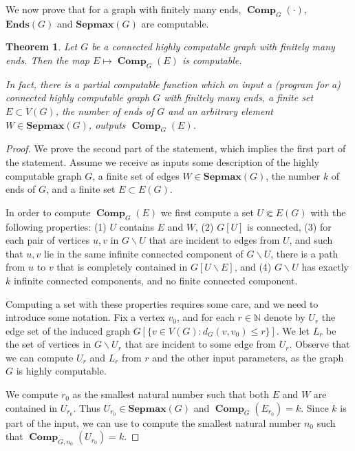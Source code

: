 \documentclass[10pt,A4]{amsart}
\newtheorem{thm}{Theorem}[section]
\theoremstyle{definition}
\theoremstyle{definition}
\newcommand{\N}{\mathbb{N}}
\newcommand{\Ends}[1]{\mathbf{Ends}({#1})}
\newcommand{\sepmax}[1]{\mathbf{Sepmax}({#1})}
\renewcommand{\mid}{ : }
\newcommand{\comp}{\operatorname{\mathbf{Comp}}}
\begin{document}
We now prove that for a graph with finitely many ends, $\comp_G(\cdot)$, $\Ends{G}$ and $\sepmax{G}$ are computable. 
\begin{thm}\label{thm:magic_function}
    Let $G$ be a connected highly computable graph with finitely many ends. Then the map $E\mapsto \comp_G(E)$ is computable. 

    In fact, there is a partial computable function which on input a (program for a) connected highly computable graph $G$ with finitely many ends, a finite set $E \subset V(G)$, the number of ends of $G$ and an arbitrary element $W \in \sepmax{G}$, outputs $\comp_{G}(E)$. 
\end{thm}
\begin{proof}
    We prove the second part of the statement, which implies the first part of the statement. Assume we receive as inputs some description of the highly computable graph $G$, a finite set of edges $W \in \sepmax{G}$, the number $k$ of ends of $G$, and a finite set $E \subset E(G)$. 
    
    In order to compute $\comp_G(E)$ we first compute  a set $U\Subset E(G)$ with the following properties: (1) $U$ contains $E$ and $W$, (2) $G[U]$ is connected, (3) for each pair of vertices  $u,v$ in $G\smallsetminus U$ that are incident to edges from $U$, and such that $u,v$ lie in the same infinite connected component of $G\smallsetminus U$, there is a path from $u$ to $v$ that is completely contained in $G[U\smallsetminus E]$, and (4) $G\smallsetminus U$ has exactly $k$ infinite connected components, and no finite connected component.
    
    Computing a set with these properties requires some care, and we need to introduce some notation. Fix a vertex $v_0$, and for each $r\in\N$ denote by $U_r$ the edge set of the induced graph $G[\{v\in V(G)\mid d_G(v,v_0)\leq r\}]$. We let $L_r$ be the set of vertices in $G\smallsetminus U_r$ that are incident to some edge from $U_r$. Observe that we can compute $U_r$ and $L_r$ from $r$ and the other input parameters, as the graph $G$ is highly computable.    
    
    We  compute $r_0$ as the smallest natural number such that both $E$ and $W$ are contained in $U_{r_0}$.  Thus $U_{r_0}\in\sepmax{G}$ and $\comp_G(E_{r_0})=k$. Since  $k$ is part of the input, we can use  to  compute the smallest natural number $n_0$ such that $\comp_{G,n_0}(U_{r_0})=k$. 
    


\end{proof}
\end{document}
